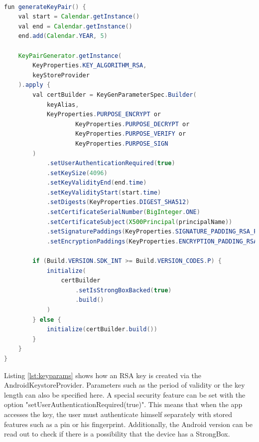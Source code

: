 \documentclass[12pt,oneside,a4paper,parskip]{scrbook}
\begin{document}
\begin{lstlisting}[label=lst:keyparams,
				   language=java,
				   firstnumber=1,
				   caption=Creating an RSA key pair]

fun generateKeyPair() {
    val start = Calendar.getInstance()
    val end = Calendar.getInstance()
    end.add(Calendar.YEAR, 5)
    
    KeyPairGenerator.getInstance(
        KeyProperties.KEY_ALGORITHM_RSA,
        keyStoreProvider
    ).apply {
        val certBuilder = KeyGenParameterSpec.Builder(
            keyAlias,
            KeyProperties.PURPOSE_ENCRYPT or
                    KeyProperties.PURPOSE_DECRYPT or
                    KeyProperties.PURPOSE_VERIFY or
                    KeyProperties.PURPOSE_SIGN
        )
            .setUserAuthenticationRequired(true)
            .setKeySize(4096)
            .setKeyValidityEnd(end.time)
            .setKeyValidityStart(start.time)
            .setDigests(KeyProperties.DIGEST_SHA512)
            .setCertificateSerialNumber(BigInteger.ONE)
            .setCertificateSubject(X500Principal(principalName))
            .setSignaturePaddings(KeyProperties.SIGNATURE_PADDING_RSA_PKCS1)
            .setEncryptionPaddings(KeyProperties.ENCRYPTION_PADDING_RSA_PKCS1)

        if (Build.VERSION.SDK_INT >= Build.VERSION_CODES.P) {
            initialize(
                certBuilder
                    .setIsStrongBoxBacked(true)
                    .build()
            )
        } else {
            initialize(certBuilder.build())
        }
    }
}

\end{lstlisting}

Listing \ref{lst:keyparams} shows how an RSA key is created via the AndroidKeystoreProvider. Parameters such as the period of validity or the key length can also be specified here. A special security feature can be set with the option "setUserAuthenticationRequired(true)". This means that when the app accesses the key, the user must authenticate himself separately with stored features such as a pin or his fingerprint. Additionally, the Android version can be read out to check if there is a possibility that the device has a StrongBox.
\end{document}
